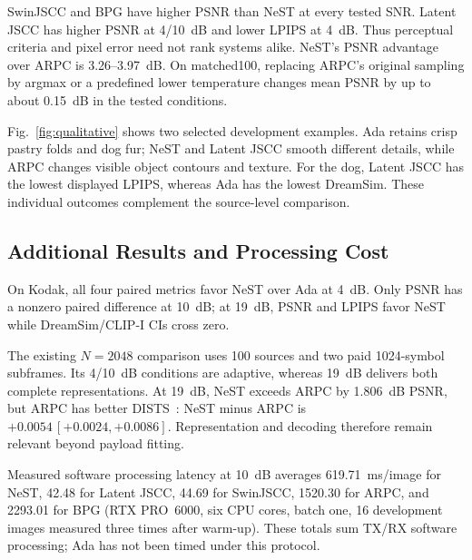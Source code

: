 SwinJSCC and BPG have higher PSNR than NeST at every tested SNR. Latent JSCC has higher PSNR at 4/10~dB and lower LPIPS at 4~dB. Thus perceptual criteria and pixel error need not rank systems alike. NeST's PSNR advantage over ARPC is 3.26--3.97~dB. On matched100, replacing ARPC's original sampling by argmax or a predefined lower temperature changes mean PSNR by up to about 0.15~dB in the tested conditions.

Fig.~\ref{fig:qualitative} shows two selected development examples. Ada retains crisp pastry folds and dog fur; NeST and Latent JSCC smooth different details, while ARPC changes visible object contours and texture. For the dog, Latent JSCC has the lowest displayed LPIPS, whereas Ada has the lowest DreamSim. These individual outcomes complement the source-level comparison.

\subsection{Additional Results and Processing Cost}
On Kodak, all four paired metrics favor NeST over Ada at 4~dB. Only PSNR has a nonzero paired difference at 10~dB; at 19~dB, PSNR and LPIPS favor NeST while DreamSim/CLIP-I CIs cross zero.

The existing $N=2048$ comparison uses 100 sources and two paid 1024-symbol subframes. Its 4/10~dB conditions are adaptive, whereas 19~dB delivers both complete representations. At 19~dB, NeST exceeds ARPC by 1.806~dB PSNR, but ARPC has better DISTS~\cite{dists}: NeST minus ARPC is $+0.0054\,[+0.0024,+0.0086]$. Representation and decoding therefore remain relevant beyond payload fitting.

Measured software processing latency at 10~dB averages 619.71~ms/image for NeST, 42.48 for Latent JSCC, 44.69 for SwinJSCC, 1520.30 for ARPC, and 2293.01 for BPG (RTX PRO~6000, six CPU cores, batch one, 16 development images measured three times after warm-up). These totals sum TX/RX software processing; Ada has not been timed under this protocol.
